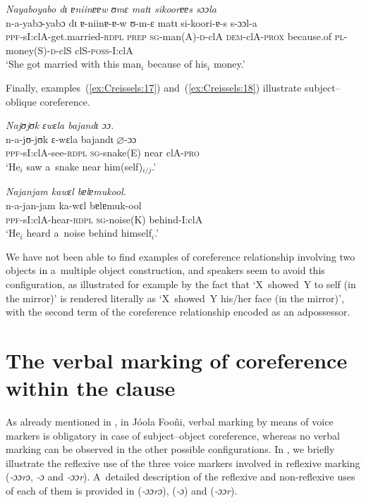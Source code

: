 \documentclass[output=paper]{langscibook}
\begin{document}
    \textit{Nayaboyabo dɩ ɐniinɐɐw ʊmɛ matɩ sikoorɐɐs sɔɔla}\\
    \gll n-a-yabɔ-yabɔ dɩ ɐ-niinɐ-ɐ-w ʊ-m-ɛ matɩ si-koori-ɐ-s s-ɔɔl-a\\
    \textsc{ppf}-sI:clA-get.married-\textsc{rdpl} \textsc{prep} \textsc{sg}-man(A)-\textsc{d}-clA \textsc{dem}-clA-\textsc{prox} because.of \textsc{pl}-money(S)-\textsc{d}-clS clS-\textsc{poss}-I:clA\\
    \glt `She got married with this man$_i$ because of his$_i$ money.'

\z

Finally, examples~(\ref{ex:Creissels:17}) and~(\ref{ex:Creissels:18}) illustrate
subject--oblique coreference.

\ea
  \label{ex:Creissels:17}
  
    \textit{Najʊjʊk ɛwɛla bajandɩ ɔɔ.}\\
    \gll n-a-jʊ-jʊk ɛ-wɛla bajandɩ $\varnothing$-ɔɔ\\
    \textsc{ppf}-sI:clA-see-\textsc{rdpl} \textsc{sg}-snake(E) near clA-\textsc{pro}\\
    \glt `He$_i$ saw a~snake near him(self)$_{i/j}$.'
\z

 \ea\label{ex:Creissels:18}
  
    \textit{Najanjam kawɛl bɐlɐmukool.}\\
    \gll n-a-jan-jam ka-wɛl bɐlɐmuk-ool\\
    \textsc{ppf}-sI:clA-hear-\textsc{rdpl} \textsc{sg}-noise(K) behind-I:clA\\
    \glt `He$_i$ heard a~noise behind himself$_i$.'

\z

We have not been able to find examples of coreference relationship involving
two objects in a~multiple object construction, and speakers seem to avoid this
configuration, as illustrated for example by the fact that `X~showed~Y to self
(in the mirror)' is rendered literally as `X~showed~Y his/her face (in the
mirror)', with the second term of the coreference relationship encoded as an
adpossessor.


\section{The verbal marking of coreference within the clause}%
\label{sec:Creissels:verbal-marking}

As already mentioned in , in Jóola Fooñi,
verbal marking by means of voice markers is obligatory in case of
subject--object coreference, whereas no verbal marking can be observed in the
other possible configurations.  In , we briefly
illustrate the reflexive use of the three voice markers involved in reflexive
marking (\textit{‑ɔɔrɔ}, \textit{‑ɔ} and \textit{‑ɔɔr}).  A~detailed description of
the reflexive and non-reflexive uses of each of them is provided in
 (\textit{‑ɔɔrɔ}),  (\textit{‑ɔ}) and
 (\textit{‑ɔɔr}).
\end{document}
